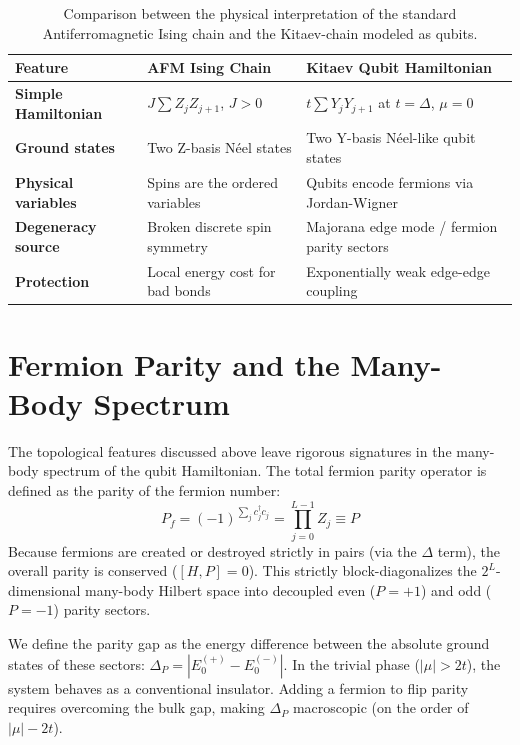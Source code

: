 \documentclass[11pt,a4paper]{article}
\begin{document}
\begin{table}[h]
\centering
\renewcommand{\arraystretch}{1.5}
\begin{tabular}{p{} p{} p{}}
\hline\hline
\textbf{Feature} & \textbf{AFM Ising Chain} & \textbf{Kitaev Qubit Hamiltonian} \\
\hline
\textbf{Simple Hamiltonian} & $J\sum Z_j Z_{j+1}$, $J>0$ & $t\sum Y_j Y_{j+1}$ at $t=\Delta$, $\mu=0$ \\
\textbf{Ground states} & Two Z-basis N\'eel states & Two Y-basis N\'eel-like qubit states \\
\textbf{Physical variables} & Spins are the ordered variables & Qubits encode fermions via Jordan-Wigner \\
\textbf{Degeneracy source} & Broken discrete spin symmetry & Majorana edge mode / fermion parity sectors \\
\textbf{Protection} & Local energy cost for bad bonds & Exponentially weak edge-edge coupling \\
\hline\hline
\end{tabular}
\caption{Comparison between the physical interpretation of the standard Antiferromagnetic Ising chain and the Kitaev-chain modeled as qubits.}
\end{table}

\section{Fermion Parity and the Many-Body Spectrum}

The topological features discussed above leave rigorous signatures in the many-body spectrum of the qubit Hamiltonian. The total fermion parity operator is defined as the parity of the fermion number:
\begin{equation}
    P_f = (-1)^{\sum_j c_j^\dagger c_j} = \prod_{j=0}^{L-1} Z_j \equiv P
\end{equation}
Because fermions are created or destroyed strictly in pairs (via the $\Delta$ term), the overall parity is conserved ($[H, P] = 0$). This strictly block-diagonalizes the $2^L$-dimensional many-body Hilbert space into decoupled even ($P = +1$) and odd ($P = -1$) parity sectors.

We define the parity gap as the energy difference between the absolute ground states of these sectors: $\Delta_P = |E_0^{(+)} - E_0^{(-)}|$. 
In the trivial phase ($|\mu| > 2t$), the system behaves as a conventional insulator. Adding a fermion to flip parity requires overcoming the bulk gap, making $\Delta_P$ macroscopic (on the order of $|\mu| - 2t$). 
\end{document}
